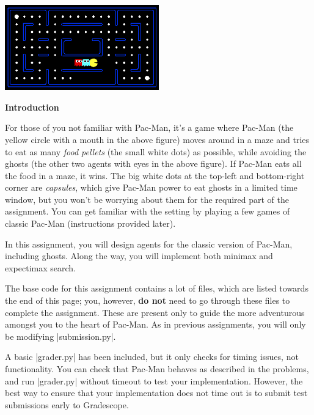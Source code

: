 \begin{center}
\includegraphics[width=0.5\textwidth]{pacman_multi_agent.png}
\end{center}

{\bf Introduction}

For those of you not familiar with Pac-Man, it's a game where Pac-Man (the
yellow circle with a mouth in the above figure) moves around in a maze and tries
to eat as many {\em food pellets} (the small white dots) as possible, while
avoiding the ghosts (the other two agents with eyes in the above figure). If
Pac-Man eats all the food in a maze, it wins. The big white dots at the top-left
and bottom-right corner are {\em capsules}, which give Pac-Man power to eat
ghosts in a limited time window, but you won't be worrying about them for the
required part of the assignment. You can get familiar with the setting by
playing a few games of classic Pac-Man (instructions provided later).

In this assignment, you will design agents for the classic version of Pac-Man,
including ghosts. Along the way, you will implement both minimax and expectimax
search.

The base code for this assignment contains a lot of files, which are listed
towards the end of this page; you, however, {\bf do not} need to go through
these files to complete the assignment. These are present only to guide the more
adventurous amongst you to the heart of Pac-Man. As in previous assignments, you
will only be modifying |submission.py|.

A basic |grader.py| has been included, but it only checks for
timing issues, not functionality. You can check that Pac-Man behaves as
described in the problems, and run |grader.py| without timeout to test your
implementation. However, the best way to ensure that your implementation does
not time out is to submit test submissions early to Gradescope.
\clearpage


\clearpage


\clearpage